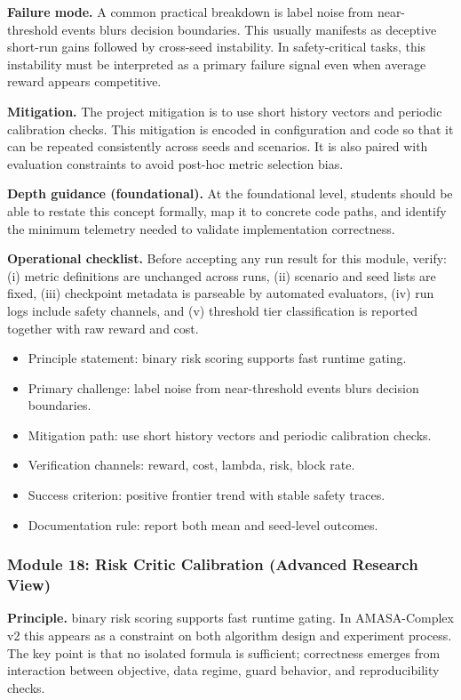 \documentclass[conference]{IEEEtran}
\begin{document}
\textbf{Failure mode.} A common practical breakdown is label noise from near-threshold events blurs decision boundaries. This usually manifests as deceptive short-run gains followed by cross-seed instability. In safety-critical tasks, this instability must be interpreted as a primary failure signal even when average reward appears competitive.

\textbf{Mitigation.} The project mitigation is to use short history vectors and periodic calibration checks. This mitigation is encoded in configuration and code so that it can be repeated consistently across seeds and scenarios. It is also paired with evaluation constraints to avoid post-hoc metric selection bias.

\textbf{Depth guidance (foundational).} At the foundational level, students should be able to restate this concept formally, map it to concrete code paths, and identify the minimum telemetry needed to validate implementation correctness.

\textbf{Operational checklist.} Before accepting any run result for this module, verify: (i) metric definitions are unchanged across runs, (ii) scenario and seed lists are fixed, (iii) checkpoint metadata is parseable by automated evaluators, (iv) run logs include safety channels, and (v) threshold tier classification is reported together with raw reward and cost.

\begin{itemize}[leftmargin=*]
  \item Principle statement: binary risk scoring supports fast runtime gating.
  \item Primary challenge: label noise from near-threshold events blurs decision boundaries.
  \item Mitigation path: use short history vectors and periodic calibration checks.
  \item Verification channels: reward, cost, lambda, risk, block rate.
  \item Success criterion: positive frontier trend with stable safety traces.
  \item Documentation rule: report both mean and seed-level outcomes.
\end{itemize}


\subsubsection{Module 18: Risk Critic Calibration (Advanced Research View)}
\textbf{Principle.} binary risk scoring supports fast runtime gating. In AMASA-Complex v2 this appears as a constraint on both algorithm design and experiment process. The key point is that no isolated formula is sufficient; correctness emerges from interaction between objective, data regime, guard behavior, and reproducibility checks.
\end{document}

